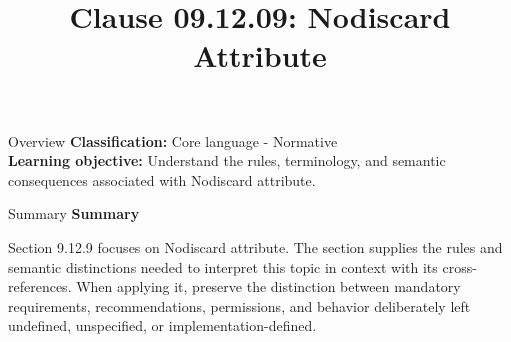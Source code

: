 \documentclass[10pt,letterpaper]{article}
\title{Clause 09.12.09: Nodiscard Attribute}
\author{}
\date{}
\begin{document}
\maketitle
\begin{CornellOverviewBox}{Overview}
\textbf{Classification:} Core language - Normative\\[2pt]
\textbf{Learning objective:} Understand the rules, terminology, and semantic consequences associated with Nodiscard attribute.
\end{CornellOverviewBox}\begin{CornellSummaryBox}{Summary}
{\sffamily\bfseries\color{Accent} Summary}\par\vspace{3pt}Section 9.12.9 focuses on Nodiscard attribute. The section supplies the rules and semantic distinctions needed to interpret this topic in context with its cross-references. When applying it, preserve the distinction between mandatory requirements, recommendations, permissions, and behavior deliberately left undefined, unspecified, or implementation-defined.
\end{CornellSummaryBox}
\end{document}
